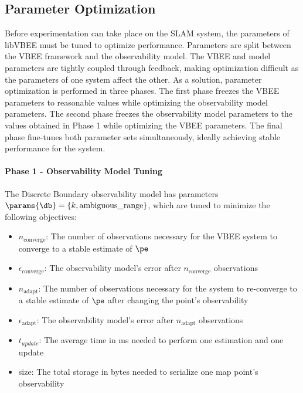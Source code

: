 \subsection{Parameter Optimization}
\label{sec:param_optimization}

Before experimentation can take place on the SLAM system, the parameters of libVBEE must be tuned to optimize performance. Parameters are split between the VBEE framework and the observability model. The VBEE and model parameters are tightly coupled through feedback, making optimization difficult as the parameters of one system affect the other. As a solution, parameter optimization is performed in three phases. The first phase freezes the VBEE parameters to reasonable values while optimizing the observability model parameters. The second phase freezes the observability model parameters to the values obtained in Phase 1 while optimizing the VBEE parameters. The final phase fine-tunes both parameter sets simultaneously, ideally achieving stable performance for the system.

\paragraph{Phase 1 - Observability Model Tuning}

The Discrete Boundary observability model has parameters $\params{\db} = \{k, \text{ambiguous\_range}\}$, which are tuned to minimize the following objectives:
\begin{itemize}
    \item $n_{\text{converge}}$: The number of observations necessary for the VBEE system to converge to a stable estimate of $\pe$
    \item $\epsilon_{\text{converge}}$: The observability model's error after $n_{\text{converge}}$ observations
    \item $n_{\text{adapt}}$: The number of observations necessary for the system to re-converge to a stable estimate of $\pe$ after changing the point's observability
    \item $\epsilon_{\text{adapt}}$: The observability model's error after $n_{\text{adapt}}$ observations
    \item $t_{update}$: The average time in ms needed to perform one estimation and one update
    \item size: The total storage in bytes needed to serialize one map point's observability
\end{itemize}

